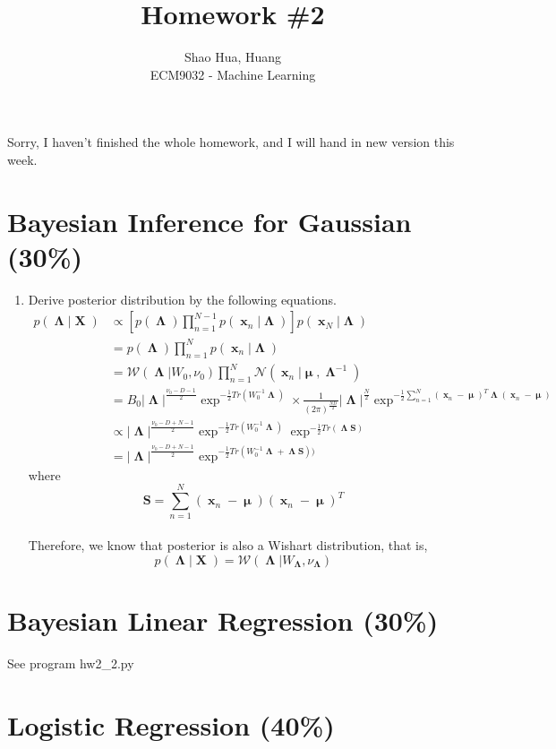 \documentclass[12pt]{article}
\title{Homework \#2}
\author{Shao Hua, Huang\\
ECM9032 - Machine Learning}
\numberwithin{equation}{section}
\DeclareMathOperator{\X}{\mathbf{X}}
\DeclareMathOperator{\x}{\mathbf{x}}
\DeclareMathOperator{\La}{\mathbf{\Lambda}}
\DeclareMathOperator{\m}{\mathbf{\mu}}
\begin{document}
\maketitle
Sorry, I haven't finished the whole homework, and I will hand in new version this week.
\section{Bayesian Inference for Gaussian (30\%)}
\begin{enumerate}
  \item Derive posterior distribution by the following equations.
    \begin{align*}
      p(\La|\X) & \propto \left[p(\La)\prod_{n=1}^{N-1}p(\x_n|\La)\right]p(\x_N|\La)\\
                & = p(\La)\prod_{n=1}^{N}p(\x_n|\La)\\
                & = \mathcal{W}(\La|W_0,\nu_0)\prod_{n=1}^{N}\mathcal{N}(\x_n|\m,\La^{-1})\\
                & = B_0|\La|^{\frac{\nu_0-D-1}{2}}\exp^{-\frac{1}{2}Tr(W_0^{-1}\La)}\times 
                    \frac{1}{(2\pi)^{\frac{ND}{2}}}|\La|^{\frac{N}{2}}\exp^{-\frac{1}{2}
                    \sum_{n=1}^{N}(\x_n-\m)^T\La(\x_n-\m)}\\
                & \propto |\La|^{\frac{\nu_0-D+N-1}{2}}\exp^{-\frac{1}{2}Tr(W_0^{-1}\La)}
                  \exp^{-\frac{1}{2}Tr(\La \mathbf{S})}\\
                & = |\La|^{\frac{\nu_0-D+N-1}{2}}\exp^{-\frac{1}{2}Tr(W_0^{-1}\La+\La\mathbf{S}))}
    \end{align*}
    where $$\mathbf{S} = \sum_{n=1}^{N}(\x_n-\m)(\x_n-\m)^T$$\\
    Therefore, we know that posterior is also a Wishart distribution, that is,
    $$p(\La|\X) = \mathcal{W}(\La|W_{\La},\nu_{\La})$$
\end{enumerate}
\section{Bayesian Linear Regression (30\%)}
See program hw2\_2.py
\section{Logistic Regression (40\%)}
\end{document}
